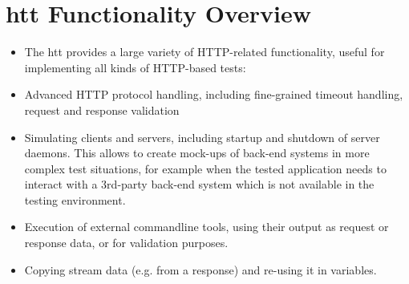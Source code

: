 \chapter{htt Functionality Overview}
\label{chap:functionality}

\begin{itemize}

 \item The htt provides a large variety of HTTP-related functionality, useful for 
implementing all kinds of HTTP-based tests:

 \item Advanced HTTP protocol handling, including fine-grained timeout handling, 
request and response validation

 \item Simulating clients and servers, including startup and shutdown of server 
daemons. This allows to create mock-ups of back-end systems in more complex 
test situations, for example when the tested application needs to interact
with a 3rd-party back-end system which is not available in the testing 
environment.

 \item Execution of external commandline tools, using their output as request 
or response data, or for validation purposes.

 \item Copying stream data (e.g. from a response) and re-using it in variables.

\end{itemize}

